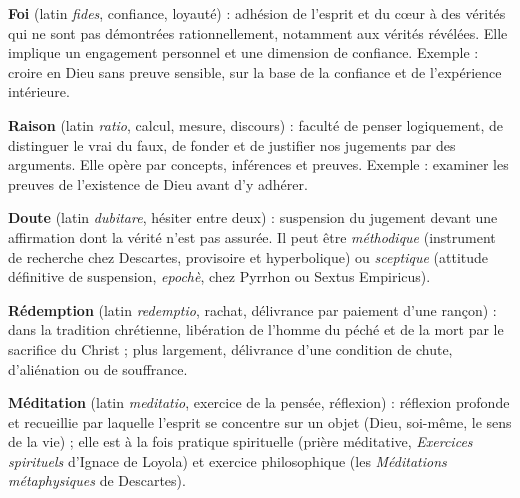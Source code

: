 \documentclass[11pt]{article}
\begin{document}
\begin{corrige}
\textbf{Foi} (latin \emph{fides}, confiance, loyauté) : adhésion de l'esprit et du cœur à des vérités qui ne sont pas démontrées rationnellement, notamment aux vérités révélées. Elle implique un engagement personnel et une dimension de confiance. Exemple : croire en Dieu sans preuve sensible, sur la base de la confiance et de l'expérience intérieure.

\textbf{Raison} (latin \emph{ratio}, calcul, mesure, discours) : faculté de penser logiquement, de distinguer le vrai du faux, de fonder et de justifier nos jugements par des arguments. Elle opère par concepts, inférences et preuves. Exemple : examiner les preuves de l'existence de Dieu avant d'y adhérer.

\textbf{Doute} (latin \emph{dubitare}, hésiter entre deux) : suspension du jugement devant une affirmation dont la vérité n'est pas assurée. Il peut être \emph{méthodique} (instrument de recherche chez Descartes, provisoire et hyperbolique) ou \emph{sceptique} (attitude définitive de suspension, \emph{epochè}, chez Pyrrhon ou Sextus Empiricus).

\textbf{Rédemption} (latin \emph{redemptio}, rachat, délivrance par paiement d'une rançon) : dans la tradition chrétienne, libération de l'homme du péché et de la mort par le sacrifice du Christ ; plus largement, délivrance d'une condition de chute, d'aliénation ou de souffrance.

\textbf{Méditation} (latin \emph{meditatio}, exercice de la pensée, réflexion) : réflexion profonde et recueillie par laquelle l'esprit se concentre sur un objet (Dieu, soi-même, le sens de la vie) ; elle est à la fois pratique spirituelle (prière méditative, \emph{Exercices spirituels} d'Ignace de Loyola) et exercice philosophique (les \emph{Méditations métaphysiques} de Descartes).
\end{corrige}
\end{document}
